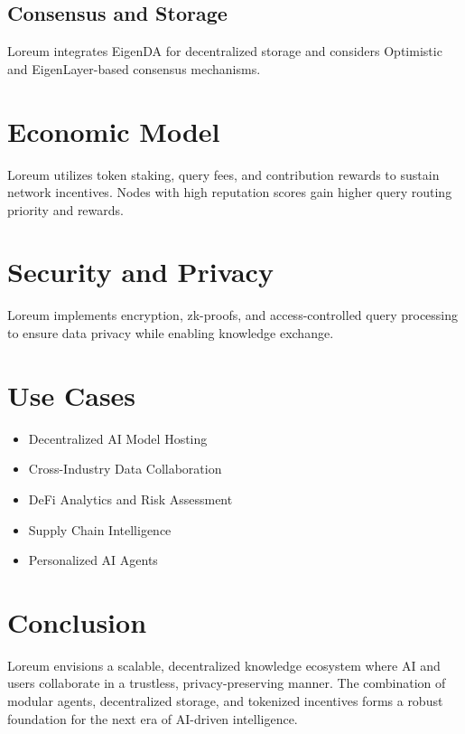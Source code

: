 \documentclass{article}
\begin{document}
\subsection{Consensus and Storage}
Loreum integrates EigenDA for decentralized storage and considers Optimistic and EigenLayer-based consensus mechanisms.

\section{Economic Model}
Loreum utilizes token staking, query fees, and contribution rewards to sustain network incentives. Nodes with high reputation scores gain higher query routing priority and rewards.

\section{Security and Privacy}
Loreum implements encryption, zk-proofs, and access-controlled query processing to ensure data privacy while enabling knowledge exchange.

\section{Use Cases}
\begin{itemize}
    \item Decentralized AI Model Hosting
    \item Cross-Industry Data Collaboration
    \item DeFi Analytics and Risk Assessment
    \item Supply Chain Intelligence
    \item Personalized AI Agents
\end{itemize}

\section{Conclusion}
Loreum envisions a scalable, decentralized knowledge ecosystem where AI and users collaborate in a trustless, privacy-preserving manner. The combination of modular agents, decentralized storage, and tokenized incentives forms a robust foundation for the next era of AI-driven intelligence.
\end{document}
